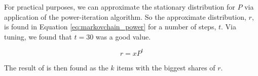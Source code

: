 For practical purposes, we can approximate the stationary distribution for $P$ via application of the power-iteration algorithm. So the approximate distribution, $r$, is found in Equation \ref{eq:markovchain_power} for a number of steps, $t$. Via tuning, we found that $t = 30$ was a good value.

\begin{equation}\label{eq:markovchain_power}
r = xP^t
\end{equation}

The result of \MC is then found as the $k$ items with the biggest shares of $r$.